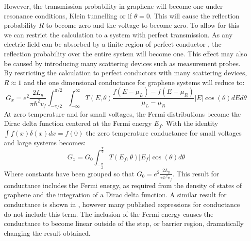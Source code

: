 			However, the transmission probability in graphene will become one under resonance conditions, Klein tunnelling or if $\theta=0$. This will cause the reflection probability $R$ to become zero and the voltage to become zero. To allow for this we can restrict the calculation to a system with perfect transmission. As any electric field can be absorbed by a finite region of perfect conductor \cite{b7}, the reflection probability over the entire system will become one. This effect may also be caused by introducing many scattering devices \cite{b6} such as measurement probes. By restricting the calculation to perfect conductors with many scattering devices, $R \approx 1$ and the one dimensional conductance for graphene systems will reduce to:
			\begin{equation}
				G_{x}=e^{2}\frac{2L_{y}}{\pi\hbar^{2}v_{f}}\int^{\pi/2}_{-\pi/2} \int^{\infty}_{-\infty} T\left(E, \theta\right)\frac{f\left(E-\mu_{L}\right)-f\left(E-\mu_{R}\right)}{\mu_{L}-\mu_{R}}|E|\cos(\theta) dE d\theta
				\label{introduction-g-t}
			\end{equation}
			At zero temperature and for small voltages, the Fermi distributions become the Dirac delta function centered at the Fermi energy $E_{f}$. With the identity $\int f(x)\delta(x) dx=f(0)$ the zero temperature conductance for small voltages and large systems becomes:
			\begin{equation}
				G_{x}= G_{0}\int^{\frac{\pi}{2}}_{-\frac{\pi}{2}} T\left(E_{f},\theta\right)|E_{f}|\cos(\theta)d\theta
				\label{introduction-g-zero}
			\end{equation}
			Where constants have been grouped so that $G_{0}=e^{2}\frac{2L_{y}}{\pi\hbar^{2}v_{f}}$. This result for conductance includes the Fermi energy, as required from the density of states of graphene and the integration of a Dirac delta function. A similar result for conductance is shown in \cite{b11, b14,b15}, however many published expressions \cite{b4, b13, b16} for conductance do not include this term. The inclusion of the Fermi energy causes the conductance to become linear outside of the step, or barrier region, dramatically changing the result obtained.
%